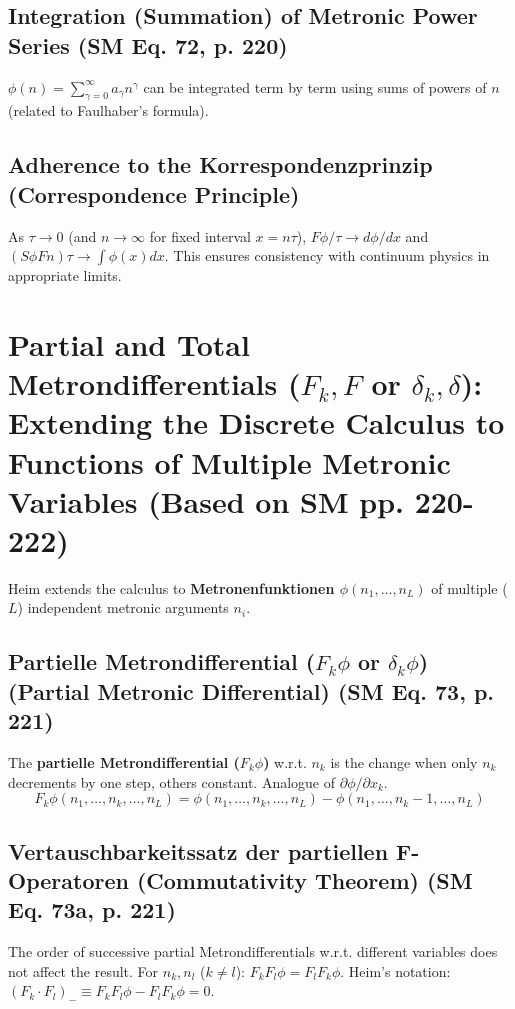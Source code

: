 \documentclass[
    12pt,              %
    a4paper,           %
    headings=normal,   %
    twoside=true,      %
    BCOR=8mm,          %
]{scrbook}
\newcommand{\metron}{\tau}
\begin{document}
\subsection{Integration (Summation) of Metronic Power Series (SM Eq. 72, p. 220)}
\label{sec:ch10_3_6_power_series}
\(\phi(n) = \sum_{\gamma=0}^{\infty} a_\gamma n^\gamma\) can be integrated term by term using sums of powers of \(n\) (related to Faulhaber's formula).

\subsection{Adherence to the Korrespondenzprinzip (Correspondence Principle)}
\label{sec:ch10_3_7_korrespondenzprinzip}
As \(\metron \to 0\) (and \(n \to \infty\) for fixed interval \(x=n\metron\)), \(F\phi/\metron \to d\phi/dx\) and \((S\phi Fn)\metron \to \int\phi(x)dx\). This ensures consistency with continuum physics in appropriate limits.

\section{Partial and Total Metrondifferentials (\(F_k, F\) or \(\delta_k, \delta\)): Extending the Discrete Calculus to Functions of Multiple Metronic Variables (Based on SM pp. 220-222)}
\label{sec:ch10_4_partial_total_metrondiff}

Heim extends the calculus to \textbf{Metronenfunktionen \( \phi(n_1, \ldots, n_L) \)} of multiple (\(L\)) independent metronic arguments \(n_i\).

\subsection{Partielle Metrondifferential (\(F_k\phi\) or \(\delta_k\phi\)) (Partial Metronic Differential) (SM Eq. 73, p. 221)}
\label{sec:ch10_4_1_partial_metrondiff}
The \textbf{partielle Metrondifferential (\(F_k\phi\))} w.r.t. \(n_k\) is the change when only \(n_k\) decrements by one step, others constant. Analogue of \(\partial\phi/\partial x_k\).
\begin{equation} \label{eq:original_partial_metrondifferential} %
F_k\phi(n_1, \dots, n_k, \dots, n_L) = \phi(n_1, \dots, n_k, \dots, n_L) - \phi(n_1, \dots, n_k-1, \dots, n_L)
\end{equation}

\subsection{Vertauschbarkeitssatz der partiellen F-Operatoren (Commutativity Theorem) (SM Eq. 73a, p. 221)}
\label{sec:ch10_4_2_vertauschbarkeitssatz}
The order of successive partial Metrondifferentials w.r.t. different variables does not affect the result. For \(n_k, n_l\) (\(k \neq l\)): \(F_kF_l\phi = F_lF_k\phi\).
Heim's notation: \( (F_k \cdot F_l)_- \equiv F_kF_l\phi - F_lF_k\phi = 0 \).
\end{document}

